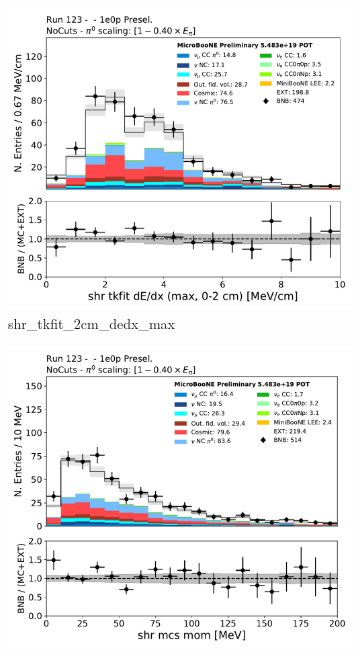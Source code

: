 \begin{figure}[H] 
\begin{center}
    \begin{subfigure}[b]{0.3\textwidth}
    \centering
    \includegraphics[width=1.00\textwidth]{1e0p/dataMCRun123/shr_tkfit_2cm_dedx_max_opendata_07312020.pdf}
    \caption{\label{fig:1e0p:dataMCRun1:shr_tkfit_gap10_dedx_U} shr\_tkfit\_2cm\_dedx\_max }
    \end{subfigure}
    \begin{subfigure}[b]{0.3\textwidth}
    \centering
    \includegraphics[width=1.00\textwidth]{1e0p/dataMCRun123/shrMCSMom.pdf}

\end{subfigure}
\end{center}
\end{figure}
